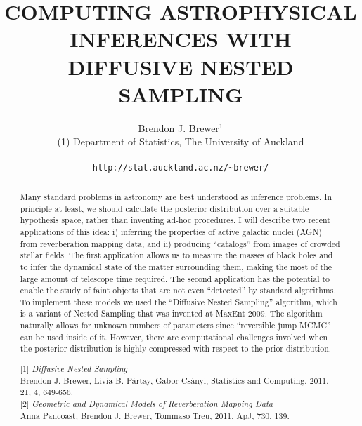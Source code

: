 \documentclass[letterpaper,12pt]{article}
\begin{document}
\title{COMPUTING ASTROPHYSICAL INFERENCES WITH DIFFUSIVE NESTED SAMPLING}

\author{\underline{Brendon J. Brewer}$^{1}$\\
        (1) Department of Statistics, The University of Auckland\\
	\\
        {\tt http://stat.auckland.ac.nz/\~{ }brewer/}
       }

\date{}
\maketitle

\begin{abstract}
\noindent

Many standard problems in astronomy are best understood as inference problems.
In principle at least,
we should calculate the posterior distribution over a suitable hypothesis space,
rather than inventing ad-hoc procedures. I will describe two recent applications
of this idea: i) inferring the properties of active galactic nuclei (AGN)
from reverberation mapping data, and ii) producing ``catalogs'' from images of
crowded stellar fields. The first application allows us to measure the masses
of black holes and to infer the dynamical state of the matter surrounding them,
making the most of the large amount of telescope time required. The second
application has the potential to enable the study of faint objects that are not
even ``detected'' by standard algorithms.
To implement these models we used the ``Diffusive Nested Sampling'' algorithm,
which is a variant of Nested Sampling that was invented at MaxEnt 2009. The
algorithm naturally allows for unknown numbers of parameters since
``reversible jump MCMC'' can be used inside of it. However, there are
computational challenges involved when the posterior distribution is highly
compressed with respect to the prior distribution.


\vspace{1cm}
\medskip{}

[1] {\it Diffusive Nested Sampling}\\
Brendon J. Brewer, Livia B. P{\'a}rtay, Gabor Cs{\'a}nyi,
Statistics and Computing, 2011, 21, 4, 649-656.\\

[2] {\it Geometric and Dynamical Models of Reverberation Mapping Data}\\
Anna Pancoast, Brendon J. Brewer, Tommaso Treu, 2011, ApJ, 730, 139.\\


\end{abstract}
\end{document}
